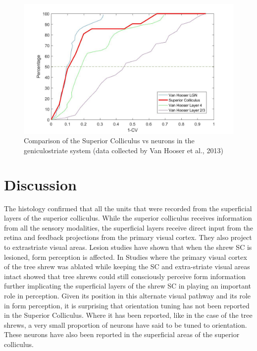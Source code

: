 	\begin{figure}
		\includegraphics[width=\linewidth]{SCvgeniculostriate.jpg}
		\caption{ Comparison of the Superior Colliculus vs neurons in the geniculostriate system (data collected by Van Hooser et al., 2013)}
		\label{fig:fig7}			
	\end{figure}
	
	
	\section{Discussion}
	
		The histology confirmed that all the units that were recorded from the superficial layers of the superior colliculus. While the superior colliculus receives information from all the sensory modalities, the superficial layers receive direct input from the retina and feedback projections from the primary visual cortex. They also project to extrastriate visual areas. Lesion studies have shown that when the shrew SC is lesioned, form perception is affected. In Studies where the primary visual cortex of the tree shrew was ablated while keeping the SC and extra-striate visual areas intact showed that tree shrews could still consciously perceive form information further implicating the superficial layers of the shrew SC in playing an important role in perception. Given its position in this alternate visual pathway and its role in form perception, it is surprising that orientation tuning has not been reported in the Superior Colliculus. Where it has been reported, like in the case of the tree shrews, a very small proportion of neurons have said to be tuned to orientation. These neurons have also been reported in the superficial areas of the superior colliculus. 
		
